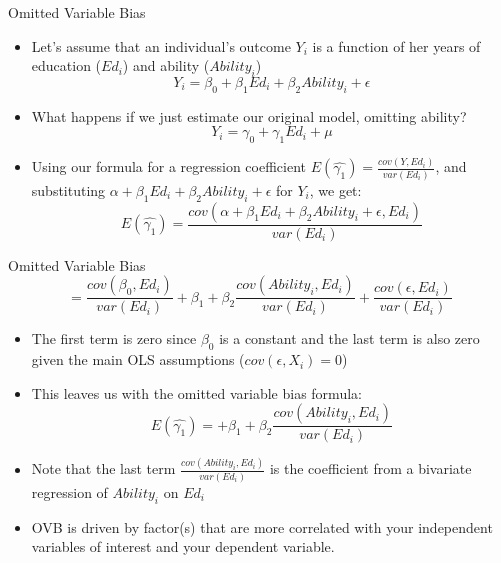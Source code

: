 \documentclass{beamer}
\begin{document}
\begin{frame}{Omitted Variable Bias}
\begin{itemize}
		\item Let's assume that an individual's outcome $Y_{i}$ is a function of her years of education ($Ed_i$) and ability ($Ability_i$)
      		  \begin{equation}
        			Y_{i}=\beta_0+\beta_{1}Ed_{i} +\beta_{2}Ability_{i} +\epsilon
       		 \end{equation}
		     \pause
		 \item What happens if we just estimate our original model, omitting ability?
      		  \begin{equation}
        			Y_{i}=\gamma_0+\gamma_{1}Ed_{i} +\mu
       		 \end{equation}		
		     \pause
		\item Using our formula for a regression coefficient  $E(\hat{\gamma_1})=\frac{cov(Y,Ed_i)}{var(Ed_i)}$, and substituting $\alpha+\beta_{1}Ed_{i} +\beta_{2}Ability_{i} +\epsilon$ for $Y_i$, we get:
		 \begin{equation}
        			E(\hat{\gamma_1})=\frac{cov(\alpha+\beta_{1}Ed_{i} +\beta_{2}Ability_{i} +\epsilon,Ed_i)}{var(Ed_i)}
       		 \end{equation}	

	\end{itemize}

\end{frame}
\begin{frame}{Omitted Variable Bias}
	\begin{equation}
        		=\frac{cov(\beta_0,Ed_i)}{var(Ed_i)}+\beta_1 +\beta_{2}\frac{cov(Ability_i,Ed_i)}{var(Ed_i)}+\frac{cov(\epsilon, Ed_i)}{var(Ed_i)}
       	\end{equation}	

	\begin{itemize}
		\item The first term is zero since $\beta_0$ is a constant and the last term is also zero given the main OLS assumptions ($cov(\epsilon, X_i)=0$)
		\pause
		\item This leaves us with the omitted variable bias formula:
	\begin{equation}
        		E(\hat{\gamma_1})=+\beta_1 +\beta_{2}\frac{cov(Ability_i,Ed_i)}{var(Ed_i)}
       	\end{equation}	
	\pause	
	\item Note that the last term $\frac{cov(Ability_i,Ed_i)}{var(Ed_i)}$ is the coefficient from a bivariate regression of $Ability_i$ on $Ed_i$
	\item OVB is driven by factor(s) that are more correlated with your independent variables of interest and your dependent variable. 
	\end{itemize}
\end{frame}
\end{document}
